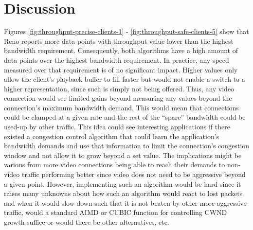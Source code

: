\documentclass[10pt,sigconf]{acmart}
\begin{document}
\section{Discussion}

Figures \ref{fig:throughput-precise-clients-1} - \ref{fig:throughput-safe-clients-5} show that Reno reports more data points with throughput value lower than the highest bandwidth requirement. Consequently, both algorithms have a high amount of data points over the highest bandwidth requirement. In practice, any speed measured over that requirement is of no significant impact. Higher values only allow the client's playback buffer to fill faster but would not enable a switch to a higher representation, since such is simply not being offered. Thus, any video connection would see limited gains beyond measuring any values beyond the connection's maximum bandwidth demand. This would mean that connections could be clamped at a given rate and the rest of the ``spare'' bandwidth could be used-up by other traffic. This idea could see interesting applications if there existed a congestion control algorithm that could learn the application's bandwidth demands and use that information to limit the connection's congestion window and not allow it to grow beyond a set value. The implications might be various from more video connections being able to reach their demands to non-video traffic performing better since video does not need to be aggressive beyond a given point. However, implementing such an algorithm would be hard since it raises many unknowns about how such an algorithm would react to lost packets and when it would slow down such that it is not beaten by other more aggressive traffic, would a standard AIMD or CUBIC function for controlling CWND growth suffice or would there be other alternatives, etc.


\end{document}
